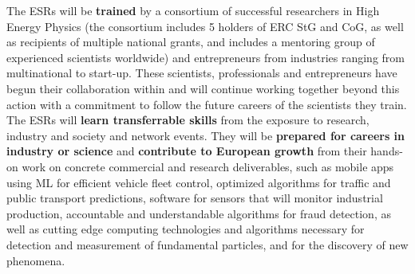 The \acronym ESRs will be \textbf{trained} by a consortium of successful researchers in High Energy Physics (the consortium includes 5 holders of ERC StG and CoG, as well as recipients of multiple national grants, and includes a mentoring group of experienced scientists worldwide) and entrepreneurs from industries ranging from multinational to start-up. 
These scientists, professionals and entrepreneurs have begun their collaboration within \acronym and will continue working together beyond this action with a commitment to follow the future careers of the scientists they train. 
The ESRs will \textbf{learn transferrable skills} from the exposure to research, industry and society and network events. 
They will be \textbf{prepared for careers in industry or science} and \textbf{contribute to European growth} from their hands-on work on concrete commercial and research deliverables, such as 
mobile apps using ML for efficient vehicle fleet control, 
optimized algorithms for traffic and public transport predictions,
software for sensors that will monitor industrial production, 
accountable and understandable algorithms for fraud detection,
as well as cutting edge computing technologies and algorithms necessary for detection and measurement of fundamental particles, and for the discovery of new phenomena. 
